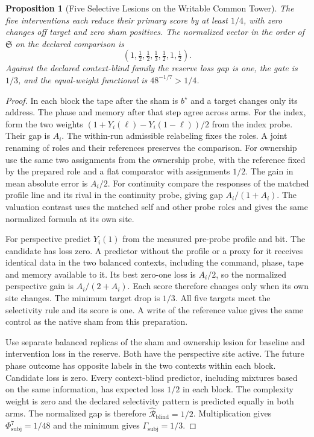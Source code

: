 \documentclass[11pt,a4paper]{article}
\newtheorem{proposition}[theorem]{Proposition}
\theoremstyle{definition}
\newcommand{\Substate}{\mathfrak{S}}
\newcommand{\Irred}{\mathcal{R}}
\newcommand{\GateSubj}{\Gamma_{\mathrm{subj}}}
\newcommand{\PhiSubj}{\Phi_{\mathrm{subj}}}
\begin{document}
\begin{proposition}[Five Selective Lesions on the Writable Common Tower]\label{prop:writable-tower-selective-lesions}
The five interventions each reduce their primary score by at least $1/4$, with zero changes off target and zero sham positives. The normalized vector in the order of $\Substate$ on the declared comparison is
\[
 (1,\tfrac12,\tfrac12,\tfrac13,\tfrac12,1,\tfrac12).
\]
Against the declared context-blind family the reserve loss gap is one, the gate is $1/3$, and the equal-weight functional is $48^{-1/7}>1/4$.
\end{proposition}
\begin{proof}
In each block the tape after the sham is $b^\star$ and a target changes only its address. The phase and memory after that step agree across arms. For the index, form the two weights $(1+Y_i(\ell)-Y_i(1-\ell))/2$ from the index probe. Their gap is $A_i$. The within-run admissible relabeling fixes the roles. A joint renaming of roles and their references preserves the comparison. For ownership use the same two assignments from the ownership probe, with the reference fixed by the prepared role and a flat comparator with assignments $1/2$. The gain in mean absolute error is $A_i/2$. For continuity compare the responses of the matched profile line and its rival in the continuity probe, giving gap $A_i/(1+A_i)$. The valuation contrast uses the matched self and other probe roles and gives the same normalized formula at its own site.

For perspective predict $Y_i(1)$ from the measured pre-probe profile and bit. The candidate has loss zero. A predictor without the profile or a proxy for it receives identical data in the two balanced contexts, including the command, phase, tape and memory available to it. Its best zero-one loss is $A_i/2$, so the normalized perspective gain is $A_i/(2+A_i)$. Each score therefore changes only when its own site changes. The minimum target drop is $1/3$. All five targets meet the selectivity rule and its score is one. A write of the reference value gives the same control as the native sham from this preparation.

Use separate balanced replicas of the sham and ownership lesion for baseline and intervention loss in the reserve. Both have the perspective site active. The future phase outcome has opposite labels in the two contexts within each block. Candidate loss is zero. Every context-blind predictor, including mixtures based on the same information, has expected loss $1/2$ in each block. The complexity weight is zero and the declared selectivity pattern is predicted equally in both arms. The normalized gap is therefore $\widehat{\Irred}_{\mathrm{blind}}=1/2$. Multiplication gives $\PhiSubj^7=1/48$ and the minimum gives $\GateSubj=1/3$.
\end{proof}
\end{document}
